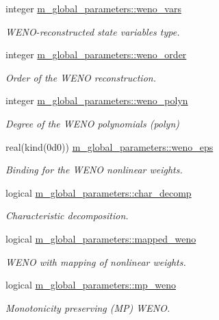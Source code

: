 \begin{DoxyCompactItemize}
integer \hyperlink{namespacem__global__parameters_aa254277cf111be2267a61b7884279844}{m\+\_\+global\+\_\+parameters\+::weno\+\_\+vars}
\begin{DoxyCompactList}\small\item\em W\+E\+N\+O-\/reconstructed state variables type. \end{DoxyCompactList}\item 
integer \hyperlink{namespacem__global__parameters_ab8488205257dab4e94258eee55d0d1aa}{m\+\_\+global\+\_\+parameters\+::weno\+\_\+order}
\begin{DoxyCompactList}\small\item\em Order of the W\+E\+NO reconstruction. \end{DoxyCompactList}\item 
integer \hyperlink{namespacem__global__parameters_a351be005cfac23e82310e91393f5d535}{m\+\_\+global\+\_\+parameters\+::weno\+\_\+polyn}
\begin{DoxyCompactList}\small\item\em Degree of the W\+E\+NO polynomials (polyn) \end{DoxyCompactList}\item 
real(kind(0d0)) \hyperlink{namespacem__global__parameters_aa25252e327df938260ddd7cc5e0a5dda}{m\+\_\+global\+\_\+parameters\+::weno\+\_\+eps}
\begin{DoxyCompactList}\small\item\em Binding for the W\+E\+NO nonlinear weights. \end{DoxyCompactList}\item 
logical \hyperlink{namespacem__global__parameters_ab62b8c589dcddff0e6295f4956012c7a}{m\+\_\+global\+\_\+parameters\+::char\+\_\+decomp}
\begin{DoxyCompactList}\small\item\em Characteristic decomposition. \end{DoxyCompactList}\item 
logical \hyperlink{namespacem__global__parameters_af2a0f6c4c9454f92703fb3bc96b4e799}{m\+\_\+global\+\_\+parameters\+::mapped\+\_\+weno}
\begin{DoxyCompactList}\small\item\em W\+E\+NO with mapping of nonlinear weights. \end{DoxyCompactList}\item 
logical \hyperlink{namespacem__global__parameters_a9106f4f1ad8f317bafc9c8934297752d}{m\+\_\+global\+\_\+parameters\+::mp\+\_\+weno}
\begin{DoxyCompactList}\small\item\em Monotonicity preserving (MP) W\+E\+NO. \end{DoxyCompactList}\item 

\end{DoxyCompactItemize}
